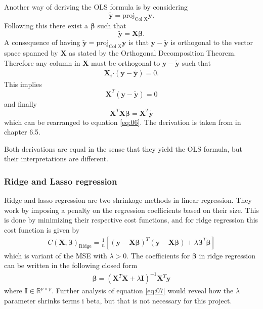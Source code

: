 \documentclass[uio,jmp,amsmath,amssymb,reprint,nofootinbib]{revtex4-1}
\numberwithin{equation}{section}
\newcommand{\lp}{\left(}
\newcommand{\rp}{\right)}
\newcommand{\lsb}{\left[}
\newcommand{\rsb}{\right]}
\newcommand{\pdot}{\boldsymbol{\cdot}}
\begin{document}
Another way of deriving the OLS formula is by considering
\begin{equation}
    \bm{\tilde{y}} = \text{proj}_{\text{Col X}}\bm{y}.
\end{equation}
Following this there exist a \(\bm{\beta}\) such that
\begin{equation}
    \bm{\tilde{y}} = \bm{X}\bm{\beta}.
\end{equation}
A consequence of having \(\bm{\tilde{y}} = \text{proj}_{\text{Col X}}\bm{y}\) is that \(\bm{y} - \bm{\tilde{y}}\) is orthogonal to the vector space spanned by \(\bm{X}\) as stated by the Orthogonal Decomposition Theorem. Therefore any column in \(\bm{X}\) must be orthogonal to \(\bm{y} - \bm{\tilde{y}}\) such that
\begin{align}
    \bm{X}_i\pdot (\bm{y} - \bm{\tilde{y}}) = 0.
\end{align}
This implies
\begin{equation}
    \bm{X}^T(\bm{y} - \bm{\tilde{y}}) = 0
\end{equation}
and finally
\begin{equation}
    \bm{X}^T\bm{X}\bm{\beta} = \bm{X}^T\bm{\tilde{y}} 
\end{equation}
which can be rearranged to equation \ref{eq:06}. The derivation is taken from \citep{LayDavidC2016Laai} in chapter 6.5.

Both derivations are equal in the sense that they yield the OLS formula, but their interpretations are different.

\subsubsection{Ridge and Lasso regression}

Ridge and lasso regression are two shrinkage methods in linear regression. They work by imposing a penalty on the regression coefficients based on their size. This is done by minimizing their respective cost functions, and for ridge regression this cost function is given by
\begin{align}
    C(\bm{X,\beta})_{\text{Ridge}} = \frac{1}{n}\lsb \lp \bm{y} - \bm{X\beta}\rp^T\lp \bm{y} - \bm{X\beta}\rp + \lambda \bm{\beta}^T\bm{\beta}\rsb
\end{align}
which is variant of the MSE with \(\lambda > 0\). The coefficients for \(\bm{\beta}\) in ridge regression can be written in the following closed form
\begin{align}\label{eq:07}
    \bm{\beta} = (\bm{X}^T\bm{X} + \lambda\bm{I})^{-1}\bm{X}^T\bm{y}
\end{align}
where \(\bm{I} \in \mathbb{R}^{p\times p}\). Further analysis of equation \ref{eq:07} would reveal how the \(\lambda\) parameter shrinks terms i beta, but that is not necessary for this project.
\end{document}

